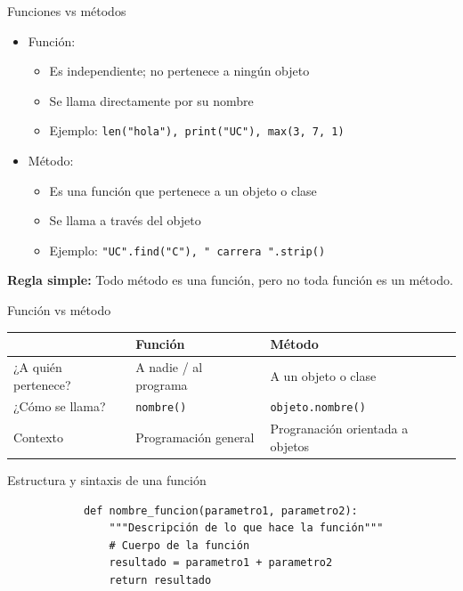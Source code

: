\documentclass{beamer}
\begin{document}
    \begin{frame}[fragile,t]{Funciones vs métodos}
        \begin{itemize}
            \item Función:
            \begin{itemize}
                \item Es independiente; no pertenece a ningún objeto
                \item Se llama directamente por su nombre
                \item Ejemplo: \texttt{len("hola"), print("UC"), max(3, 7, 1)}
            \end{itemize}
            \item Método:
                \begin{itemize}
                    \item Es una función que pertenece a un objeto o clase
                    \item Se llama a través del objeto
                    \item Ejemplo: \texttt{"UC".find("C"), "  carrera  ".strip()}
                \end{itemize}
        \end{itemize}
        \textbf{Regla simple:} Todo método es una función, pero no toda función es un método.
    \end{frame}

    \begin{frame}[fragile, t]{Función vs método}
        \begin{tabular}{|p{2.5cm}|p{3.3cm}|p{3.3cm}|}
            \hline
             & Función & Método \\ \hline
            ¿A quién pertenece? & A nadie / al programa & A un objeto o clase \\ \hline
            ¿Cómo se llama? & \texttt{nombre()} & \texttt{objeto.nombre()} \\ \hline
            Contexto & Programación general & Progranación orientada a objetos \\
            \hline
        \end{tabular}
    \end{frame}

    \begin{frame}[fragile,t]{Estructura y sintaxis de una función}
        \begin{verbatim}
            def nombre_funcion(parametro1, parametro2):
                """Descripción de lo que hace la función"""
                # Cuerpo de la función
                resultado = parametro1 + parametro2
                return resultado
        \end{verbatim}
    \end{frame}
\end{document}
